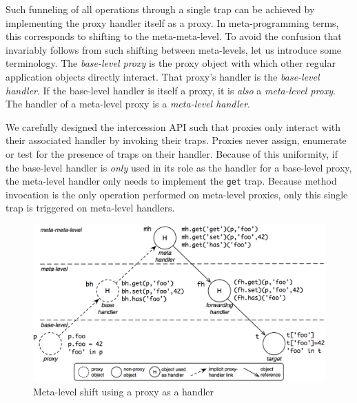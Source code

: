 \documentclass{sig-alternate}
\begin{document}
Such funneling of all operations through a single trap can be achieved by implementing the proxy handler itself as a proxy. In meta-programming terms, this corresponds to shifting to the meta-meta-level. To avoid the confusion that invariably follows from such shifting between meta-levels, let us introduce some terminology. The \emph{base-level proxy} is the proxy object with which other regular application objects directly interact. That proxy's handler is the \emph{base-level handler}. If the base-level handler is itself a proxy, it is \emph{also} a \emph{meta-level proxy}. The handler of a meta-level proxy is a \emph{meta-level handler}.

We carefully designed the intercession API such that proxies only interact with their associated handler by invoking their traps. Proxies never assign, enumerate or test for the presence of traps on their handler. Because of this uniformity, if the base-level handler is \emph{only} used in its role as the handler for a base-level proxy, the meta-level handler only needs to implement the \texttt{get} trap. Because method invocation is the only operation performed on meta-level proxies, only this single trap is triggered on meta-level handlers.


\begin{figure}[htbp]
  \centering
    \includegraphics[width=1.0\columnwidth]{MetaLevelShifting.png}
  \caption{Meta-level shift using a proxy as a handler}
  \label{fig:shift}
\end{figure}
\end{document}
